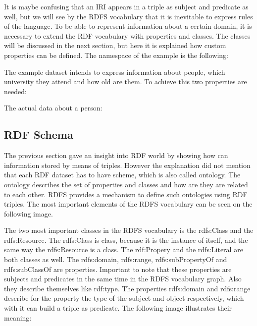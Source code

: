 
It is maybe confusing that an IRI appears in a triple as subject and predicate as well, but we will see by the RDFS vocabulary that it is inevitable to express rules of the language.  
To be able to represent information about a certain domain, it is necessary to extend the RDF vocabulary with properties and classes. The classes will be discussed in the next section, but here it is explained how custom properties can be defined. The namespace of the example is the following: 



The example dataset intends to express information about people, which university they attend and how old are them. To achieve this two properties are needed:



The actual data about a person:



\subsection{RDF Schema}


The previous section gave an insight into RDF world by showing how can information stored by means of triples. However the explanation did not mention that each RDF dataset has to have scheme, which is also called ontology. The ontology describes the set of properties and classes and how are they are related to each other. RDFS provides a mechanism to define such ontologies using RDF triples. The most important elements of the RDFS vocabulary can be seen on the following image. 


The two most important classes in the RDFS vocabulary is the rdfs:Class and the rdfs:Resource. The rdfs:Class is class, because it is the instance of itself, and the same way the rdfs:Resource is a class. The rdf:Propery and the rdfs:Literal are both classes as well. The rdfs:domain, rdfs:range, rdfs:subPropertyOf and rdfs:subClassOf are properties. Important to note that these properties are subjects and predicates in the same time in the RDFS vocabulary graph. Also they describe themselves like rdf:type.
The properties rdfs:domain and rdfs:range describe for the property the type of the subject and object respectively, which with it can build a triple as predicate. The following image illustrates their meaning:

